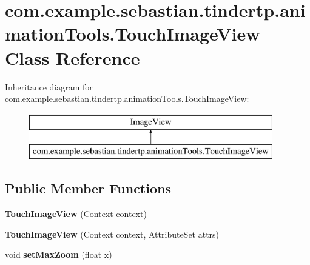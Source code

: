 \hypertarget{classcom_1_1example_1_1sebastian_1_1tindertp_1_1animationTools_1_1TouchImageView}{}\section{com.\+example.\+sebastian.\+tindertp.\+animation\+Tools.\+Touch\+Image\+View Class Reference}
\label{classcom_1_1example_1_1sebastian_1_1tindertp_1_1animationTools_1_1TouchImageView}
Inheritance diagram for com.\+example.\+sebastian.\+tindertp.\+animation\+Tools.\+Touch\+Image\+View\+:\begin{figure}[H]
\begin{center}
\leavevmode
\includegraphics[height=2.000000cm]{classcom_1_1example_1_1sebastian_1_1tindertp_1_1animationTools_1_1TouchImageView}
\end{center}
\end{figure}
\subsection*{Public Member Functions}
\begin{DoxyCompactItemize}
\item 
{\bfseries Touch\+Image\+View} (Context context)\hypertarget{classcom_1_1example_1_1sebastian_1_1tindertp_1_1animationTools_1_1TouchImageView_a6f8ac0d2ac5d94b422fced31970a9cb9}{}\label{classcom_1_1example_1_1sebastian_1_1tindertp_1_1animationTools_1_1TouchImageView_a6f8ac0d2ac5d94b422fced31970a9cb9}

\item 
{\bfseries Touch\+Image\+View} (Context context, Attribute\+Set attrs)\hypertarget{classcom_1_1example_1_1sebastian_1_1tindertp_1_1animationTools_1_1TouchImageView_a389cf4d858cee8d2c06d3cca1e7b94bc}{}\label{classcom_1_1example_1_1sebastian_1_1tindertp_1_1animationTools_1_1TouchImageView_a389cf4d858cee8d2c06d3cca1e7b94bc}

\item 
void {\bfseries set\+Max\+Zoom} (float x)\hypertarget{classcom_1_1example_1_1sebastian_1_1tindertp_1_1animationTools_1_1TouchImageView_a0b69c26cbc0175a47dbf68f30e7d4a3e}{}\label{classcom_1_1example_1_1sebastian_1_1tindertp_1_1animationTools_1_1TouchImageView_a0b69c26cbc0175a47dbf68f30e7d4a3e}

\end{DoxyCompactItemize}

